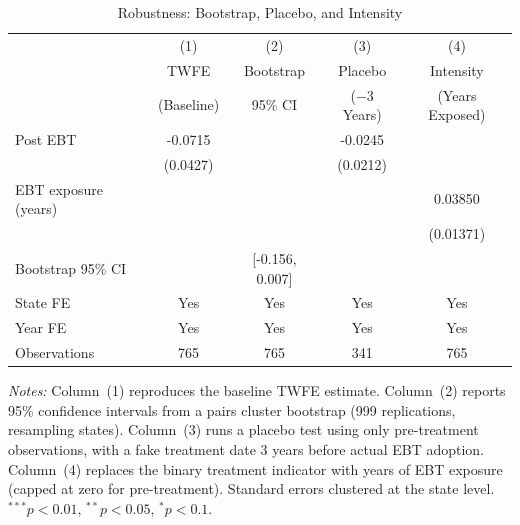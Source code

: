 \begin{table}[htbp]
\centering
\caption{Robustness: Bootstrap, Placebo, and Intensity}
\label{tab:robustness}
\begin{tabular}{lcccc}
\hline\hline
 & (1) & (2) & (3) & (4) \\
 & TWFE & Bootstrap & Placebo & Intensity \\
 & (Baseline) & 95\% CI & ($-3$ Years) & (Years Exposed) \\
\hline
Post EBT & -0.0715 & & -0.0245 & \\
 & (0.0427) & & (0.0212) & \\
EBT exposure (years) & & & & 0.03850 \\
 & & & & (0.01371) \\
Bootstrap 95\% CI & & [-0.156, 0.007] & & \\
\hline
State FE & Yes & Yes & Yes & Yes \\
Year FE & Yes & Yes & Yes & Yes \\
Observations & 765 & 765 & 341 & 765 \\
\hline\hline
\end{tabular}
\begin{tablenotes}[flushleft]
\small
\item \textit{Notes:} Column~(1) reproduces the baseline TWFE estimate. Column~(2) reports 95\% confidence intervals from a pairs cluster bootstrap (999 replications, resampling states). Column~(3) runs a placebo test using only pre-treatment observations, with a fake treatment date 3 years before actual EBT adoption. Column~(4) replaces the binary treatment indicator with years of EBT exposure (capped at zero for pre-treatment). Standard errors clustered at the state level. $^{***}p<0.01$, $^{**}p<0.05$, $^{*}p<0.1$.
\end{tablenotes}
\end{table}

